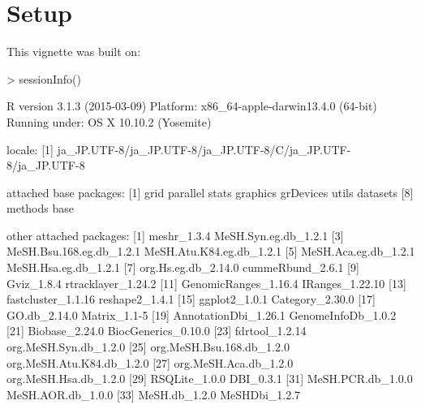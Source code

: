 \documentclass[11pt]{article}
\begin{document}
\clearpage
\section{Setup}

This vignette was built on:
\begin{Schunk}
\begin{Sinput}
> sessionInfo()
\end{Sinput}
\begin{Soutput}
R version 3.1.3 (2015-03-09)
Platform: x86_64-apple-darwin13.4.0 (64-bit)
Running under: OS X 10.10.2 (Yosemite)

locale:
[1] ja_JP.UTF-8/ja_JP.UTF-8/ja_JP.UTF-8/C/ja_JP.UTF-8/ja_JP.UTF-8

attached base packages:
[1] grid      parallel  stats     graphics  grDevices utils     datasets 
[8] methods   base     

other attached packages:
 [1] meshr_1.3.4               MeSH.Syn.eg.db_1.2.1     
 [3] MeSH.Bsu.168.eg.db_1.2.1  MeSH.Atu.K84.eg.db_1.2.1 
 [5] MeSH.Aca.eg.db_1.2.1      MeSH.Hsa.eg.db_1.2.1     
 [7] org.Hs.eg.db_2.14.0       cummeRbund_2.6.1         
 [9] Gviz_1.8.4                rtracklayer_1.24.2       
[11] GenomicRanges_1.16.4      IRanges_1.22.10          
[13] fastcluster_1.1.16        reshape2_1.4.1           
[15] ggplot2_1.0.1             Category_2.30.0          
[17] GO.db_2.14.0              Matrix_1.1-5             
[19] AnnotationDbi_1.26.1      GenomeInfoDb_1.0.2       
[21] Biobase_2.24.0            BiocGenerics_0.10.0      
[23] fdrtool_1.2.14            org.MeSH.Syn.db_1.2.0    
[25] org.MeSH.Bsu.168.db_1.2.0 org.MeSH.Atu.K84.db_1.2.0
[27] org.MeSH.Aca.db_1.2.0     org.MeSH.Hsa.db_1.2.0    
[29] RSQLite_1.0.0             DBI_0.3.1                
[31] MeSH.PCR.db_1.0.0         MeSH.AOR.db_1.0.0        
[33] MeSH.db_1.2.0             MeSHDbi_1.2.7            


\end{Soutput}
\end{Schunk}
\end{document}
